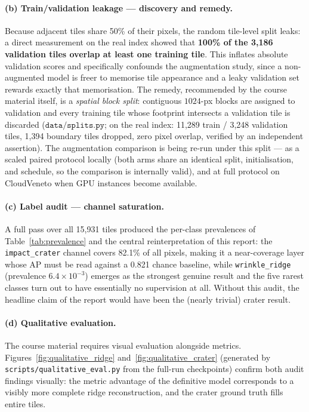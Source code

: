 \paragraph{(b) Train/validation leakage --- discovery and remedy.}
Because adjacent tiles share 50\% of their pixels, the random tile-level split leaks: a direct measurement on the real index showed that \textbf{100\% of the 3{,}186 validation tiles overlap at least one training tile}. This inflates absolute validation scores and specifically confounds the augmentation study, since a non-augmented model is freer to memorise tile appearance and a leaky validation set rewards exactly that memorisation. The remedy, recommended by the course material itself, is a \emph{spatial block split}: contiguous $1024$-px blocks are assigned to validation and every training tile whose footprint intersects a validation tile is discarded ($\texttt{data/splits.py}$; on the real index: 11{,}289 train / 3{,}248 validation tiles, 1{,}394 boundary tiles dropped, zero pixel overlap, verified by an independent assertion). The augmentation comparison is being re-run under this split — as a scaled paired protocol locally (both arms share an identical split, initialisation, and schedule, so the comparison is internally valid), and at full protocol on CloudVeneto when GPU instances become available.

\paragraph{(c) Label audit --- channel saturation.}
A full pass over all 15{,}931 tiles produced the per-class prevalences of Table~\ref{tab:prevalence} and the central reinterpretation of this report: the \texttt{impact\_crater} channel covers 82.1\% of all pixels, making it a near-coverage layer whose AP must be read against a 0.821 chance baseline, while \texttt{wrinkle\_ridge} (prevalence $6.4\times10^{-3}$) emerges as the strongest genuine result and the five rarest classes turn out to have essentially no supervision at all. Without this audit, the headline claim of the report would have been the (nearly trivial) crater result.

\paragraph{(d) Qualitative evaluation.}
The course material requires visual evaluation alongside metrics. Figures~\ref{fig:qualitative_ridge} and~\ref{fig:qualitative_crater} (generated by \texttt{scripts/qualitative\_eval.py} from the full-run checkpoints) confirm both audit findings visually: the metric advantage of the definitive model corresponds to a visibly more complete ridge reconstruction, and the crater ground truth fills entire tiles.

